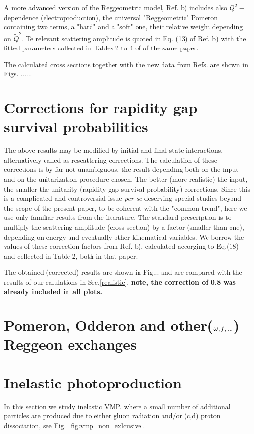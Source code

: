 \documentclass[12pt]{article}
\begin{document}
A more advanced version of the Reggeometric model, Ref. \cite{Fazio}b) includes also $Q^2-$ dependence (electroproduction), the universal "Reggeometric" Pomeron containing two terms, a "hard" and a "soft" one, their relative weight depending on $\tilde Q^2$. Te relevant scattering amplitude is quoted in Eq. (13) of Ref. \cite{Fazio}b) with the fitted parameters collected in Tables 2 to 4 of of the same paper.

The calculated cross sections together with the new data from Refs. \cite{LHCb1, LHCb2} are shown in Figs. ......

\section{Corrections for rapidity gap survival probabilities}\label{corrections}
The above results may be modified by initial and final state interactions,
alternatively called as rescattering corrections. The calculation of these
corrections is by far not unambiguous, the result depending both on the input 
and on the unitarization procedure chosen. The better (more realistic) the input, the smaller the unitarity (rapidity gap survival probability) corrections. 
Since this is a complicated and controversial issue {\it per se} deserving special studies beyond the scope of the present paper, to be coherent with the "common trend", here we use only familiar results from the literature. The standard prescription is to multiply the scattering amplitude (cross section) by a factor (smaller than one), depending on energy and eventually other kinematical variables. 
We borrow the values of these correction factors from Ref.\cite{Ryskin} b), calculated accorging to Eq.(18) and collected in Table 2, both in that paper.

The obtained (corrected) results are shown in Fig... and are compared with the results of our calulations in Sec.\ref{realistic}.
{\bf note, the correction of 0.8 was already included in all plots.}
\section{Pomeron, Odderon and other($\omega, {\it f},...$) Reggeon exchanges}\label{Reggeons}

\section{Inelastic photoproduction} 
In this section we study inelastic VMP, where a small number of additional particles are produced due to either gluon radiation and/or (c,d) proton dissociation, see Fig.~\ref{fig:vmp_non_exlcusive}.
\end{document}
